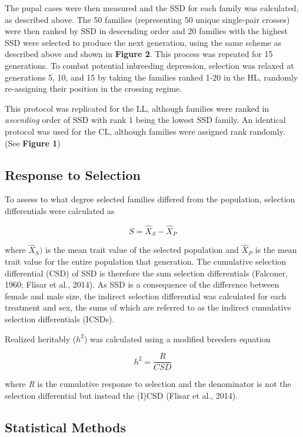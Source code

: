 \documentclass[12pt,reqno,oneside]{report}
\begin{document}
The pupal cases were then measured and the SSD for each family was calculated, as described above. The 50 families (representing 50 unique single-pair crosses) were then ranked by SSD in descending order and 20 families with the highest SSD were selected to produce the next generation, using the same scheme as described above and shown in \textbf{Figure 2}. This process was repeated for 15 generations. To combat potential inbreeding depression, selection was relaxed at generations 5, 10, and 15 by taking the families ranked 1-20 in the HL, randomly re-assigning their position in the crossing regime. 

This protocol was replicated for the LL, although families were ranked in \textit{ascending} order of SSD with rank 1 being the lowest SSD family. An identical protocol was used for the CL, although families were assigned rank randomly. (See \textbf{Figure 1})

\subsection{Response to Selection}

To assess to what degree selected families differed from the population, selection differentials were calculated as 

\[S = \hat{X}_S - \hat{X}_P\]

\noindent where \(\hat{X}_S)\) is the mean trait value of the selected population and \(\hat{X}_P\) is the mean trait value for the entire population that generation. The cumulative selection differential (CSD) of SSD is therefore the sum selection differentials (Falconer, 1960; Flisar et al., 2014). As SSD is a consequence of the difference between female and male size, the indirect selection differential was calculated for each treatment and sex, the sums of which are referred to as the indirect cumulative selection differentials (ICSDs).

Realized heritably (\(h^2\)) was calculated using a modified breeders equation 

\[h^2 = \frac{R}{CSD}\]

\noindent where \textit{R} is the cumulative response to selection and the denominator is not the selection differential but instead the (I)CSD (Flisar et al., 2014). 

\subsection{Statistical Methods}
\end{document}
